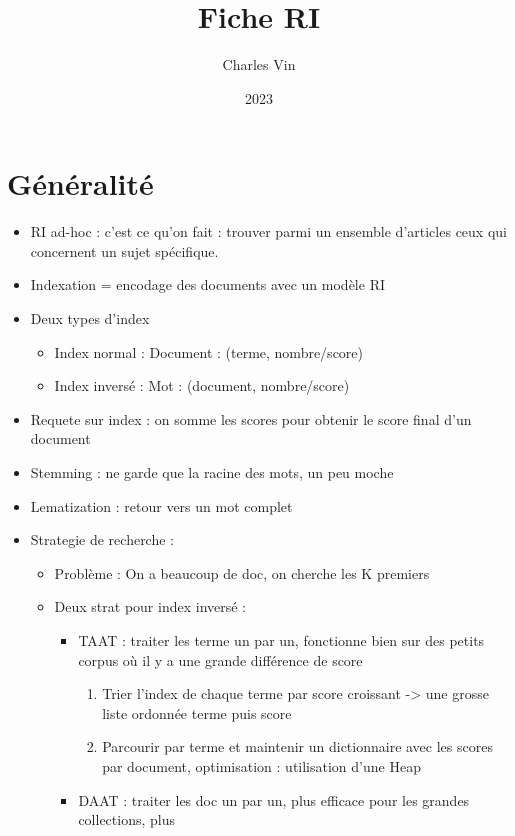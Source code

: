 \documentclass{article}
\title{Fiche RI}
\author{Charles Vin}
\date{2023}
\theoremstyle{plain}%
\theoremstyle{definition}
\theoremstyle{remark}
\begin{document}
\maketitle

\section{Généralité}
\begin{itemize}
    \item RI ad-hoc : c'est ce qu'on fait : trouver parmi un ensemble d'articles ceux qui concernent un sujet spécifique.
    \item Indexation = encodage des documents avec un modèle RI
    \item Deux types d'index \begin{itemize}
        \item Index normal : Document : (terme, nombre/score)
        \item Index inversé : Mot : (document, nombre/score)
    \end{itemize}
    \item Requete sur index : on somme les scores pour obtenir le score final d'un document
    \item Stemming : ne garde que la racine des mots, un peu moche 
    \item Lematization : retour vers un mot complet
    \item Strategie de recherche : \begin{itemize}
        \item Problème : On a beaucoup de doc, on cherche les K premiers
        \item Deux strat  pour index inversé : \begin{itemize}
            \item TAAT : traiter les terme un par un, fonctionne bien sur des petits corpus où il y a une grande différence de score \begin{enumerate}
                \item Trier l'index de chaque terme par score croissant -> une grosse liste ordonnée terme puis score 
                \item Parcourir par terme et maintenir un dictionnaire avec les scores par document, optimisation : utilisation d'une Heap
            \end{enumerate}
            \item DAAT : traiter les doc un par un, plus efficace pour les grandes collections, plus 
        \end{itemize}
    \end{itemize}
\end{itemize}
\end{document}
